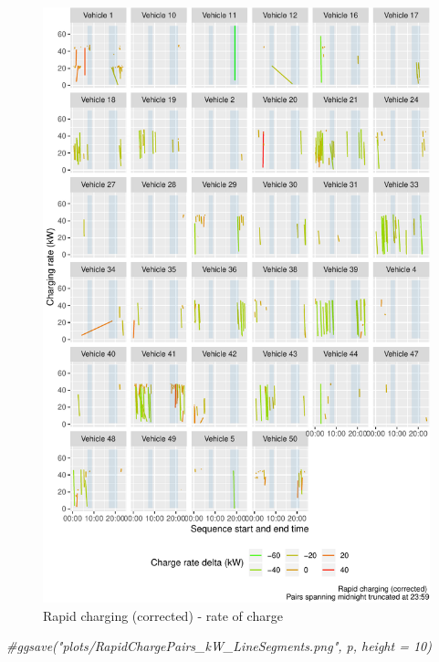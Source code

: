 \documentclass[]{article}
\newenvironment{Shaded}{\begin{snugshade}}{\end{snugshade}}
\newcommand{\CommentTok}[1]{\textcolor[rgb]{0.56,0.35,0.01}{\textit{#1}}}
\begin{document}
\begin{figure}
\centering
\includegraphics{EVBB_report_v1_files/figure-latex/checkRapidSequenceskW-1.pdf}
\caption{\label{fig:checkRapidSequenceskW}Rapid charging (corrected) - rate of charge}
\end{figure}

\begin{Shaded}
\begin{Highlighting}[]
\CommentTok{#ggsave("plots/RapidChargePairs_kW_LineSegments.png", p, height = 10)}
\end{Highlighting}
\end{Shaded}
\end{document}
